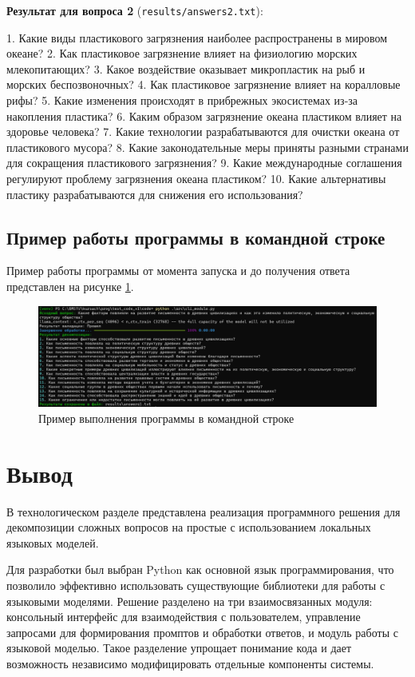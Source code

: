 \textbf{Результат для вопроса 2} (\texttt{results/answers2.txt}):
\begin{spverbatim}
1. Какие виды пластикового загрязнения наиболее распространены в мировом океане?
2. Как пластиковое загрязнение влияет на физиологию морских млекопитающих?
3. Какое воздействие оказывает микропластик на рыб и морских беспозвоночных?
4. Как пластиковое загрязнение влияет на коралловые рифы?
5. Какие изменения происходят в прибрежных экосистемах из-за накопления пластика?
6. Каким образом загрязнение океана пластиком влияет на здоровье человека?
7. Какие технологии разрабатываются для очистки океана от пластикового мусора?
8. Какие законодательные меры приняты разными странами для сокращения пластикового загрязнения?
9. Какие международные соглашения регулируют проблему загрязнения океана пластиком?
10. Какие альтернативы пластику разрабатываются для снижения его использования?
\end{spverbatim}

\subsection{Пример работы программы в командной строке}

Пример работы программы от момента запуска и до получения ответа представлен на рисунке \ref{fig:program_execution}.

\begin{figure}[H]
\centering
\includegraphics[width=1\textwidth]{images/program_execution.pdf}
\caption{Пример выполнения программы в командной строке}
\label{fig:program_execution}
\end{figure}

\section{Вывод}

В технологическом разделе представлена реализация программного решения для декомпозиции сложных вопросов на простые с использованием локальных языковых моделей.

Для разработки был выбран Python как основной язык программирования, что позволило эффективно использовать существующие библиотеки для работы с языковыми моделями. Решение разделено на три взаимосвязанных модуля: консольный интерфейс для взаимодействия с пользователем, управление запросами для формирования промптов и обработки ответов, и модуль работы с языковой моделью. Такое разделение упрощает понимание кода и дает возможность независимо модифицировать отдельные компоненты системы.

